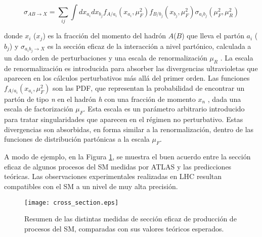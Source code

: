 \begin{equation}
\sigma_{AB\rightarrow X}=\sum_{ij}\int dx_{a_{i}}dx_{b_{j}}f_{A/a_{i}}(x_{a_{i}},\mu_{F}^{2})f_{B/b_{j}}(x_{b_{j}},\mu_{F}^{2})\sigma_{a_{i}b_{j}}(\mu_{F}^{2},\mu_{R}^{2})
\end{equation}

donde $x_{i}$ ($x_{j}$) es la fracción del momento del hadrón $A$($B$) que lleva el partón $a_{i}$ ($b_{j}$) y $\sigma_{a_{i}b_{j}\rightarrow X}$ es la sección eficaz de la interacción a nivel partónico, calculada a un dado orden de perturbaciones y una escala de renormalización $\mu_R$ . La escala de renormalización es introducida para absorber las divergencias ultravioletas que aparecen en los cálculos perturbativos más allá del primer orden. Las funciones $f_{A/a_{i}}(x_{a_{i}},\mu_{F}^{2})$ son las PDF, que representan la probabilidad de encontrar un partón de tipo \textit{n} en el hadrón \textit{h} con una fracción de momento $x_{n}$ , dada una escala de factorización $\mu_{F}$. Esta escala es un parámetro arbitrario introducido para tratar singularidades que aparecen en el régimen no perturbativo. Estas divergencias son absorbidas, en forma similar a la renormalización, dentro de las funciones de distribución partónicas a la escala $\mu_{F}$. 


A modo de ejemplo, en la Figura \ref{cross_section}, se muestra el buen acuerdo entre la sección eficaz de algunos procesos del SM medidas por ATLAS y las predicciones teóricas. Las observaciones experimentales realizadas en LHC resultan compatibles con el SM a un nivel de muy alta precisión.


\begin{figure}[ht]
\centering
\texttt{[image: cross\_section.eps]}
\caption{Resumen de las distintas medidas de sección eficaz de producción de procesos del SM, comparadas con sus valores teóricos esperados.}
\label{cross_section}
\end{figure}